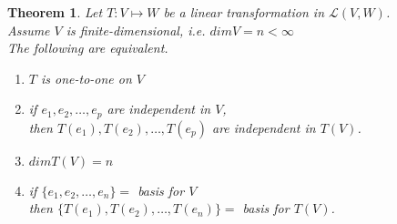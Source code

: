 \documentclass[twoside]{amsart}
\theoremstyle{plain}
\newtheorem{theorem}{Theorem}
\theoremstyle{definition}
\begin{document}
\begin{theorem}
  Let $T:V\mapsto W$ be a linear transformation in $\mathcal{L}(V,W)$.  \\
  Assume $V$ is finite-dimensional, i.e. $dim V = n < \infty$ \\
  The following are equivalent.  
  \begin{enumerate}
  \item $T$ is one-to-one on $V$ 
  \item if $e_1,e_2, \dots, e_p$ are independent in $V$, \\
    \phantom{if} then $T(e_1),T(e_2), \dots ,T(e_p)$ are independent in $T(V)$.  
  \item $dim T(V) = n$ 
  \item if $\{ e_1, e_2, \dots, e_n \} =$ basis for $V$ \\
    \phantom{if} then  $\{ T(e_1), T(e_2), \dots, T(e_n) \} =$ basis for $T(V)$.  
    \end{enumerate}
  \end{theorem}
\end{document}
